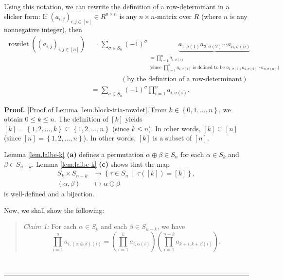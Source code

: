 \documentclass[numbers=enddot,12pt,final,onecolumn,notitlepage,english]{scrartcl}%
\theoremstyle{definition}
\newenvironment{statement}{\begin{quote}}{\end{quote}}
\newenvironment{proof}[1][Proof]{\noindent\textbf{#1.} }{\ \rule{0.5em}{0.5em}}
\let\sumnonlimits\sum
\let\prodnonlimits\prod
\renewcommand{\sum}{\sumnonlimits\limits}
\renewcommand{\prod}{\prodnonlimits\limits}
\newenvironment{verlong}{}{}
\begin{document}
\begin{verlong}
Using this notation, we can rewrite the definition of a row-determinant in a
slicker form: If $\left(  a_{i,j}\right)  _{i,j\in\left[  n\right]  }\in
R^{n\times n}$ is any $n\times n$-matrix over $R$ (where $n$ is any
nonnegative integer), then%
\begin{align}
\operatorname*{rowdet}\left(  \left(  a_{i,j}\right)  _{i,j\in\left[
n\right]  }\right)   &  =\sum_{\sigma\in S_{n}}\left(  -1\right)  ^{\sigma
}\underbrace{a_{1,\sigma\left(  1\right)  }a_{2,\sigma\left(  2\right)
}\cdots a_{n,\sigma\left(  n\right)  }}_{\substack{=\prod_{i=1}^{n}%
a_{i,\sigma\left(  i\right)  }\\\text{(since }\prod_{i=1}^{n}a_{i,\sigma
\left(  i\right)  }\text{ is defined to be }a_{1,\sigma\left(  1\right)
}a_{2,\sigma\left(  2\right)  }\cdots a_{n,\sigma\left(  n\right)  }\text{)}%
}}\nonumber\\
&  \ \ \ \ \ \ \ \ \ \ \ \ \ \ \ \ \ \ \ \ \left(  \text{by the definition of
a row-determinant}\right) \nonumber\\
&  =\sum_{\sigma\in S_{n}}\left(  -1\right)  ^{\sigma}\prod_{i=1}%
^{n}a_{i,\sigma\left(  i\right)  }. \label{pf.lem.block-tria-rowdet.rowdet=}%
\end{align}


\begin{proof}
[Proof of Lemma \ref{lem.block-tria-rowdet}.]From $k\in\left\{  0,1,\ldots
,n\right\}  $, we obtain $0\leq k\leq n$. The definition of $\left[  k\right]
$ yields $\left[  k\right]  =\left\{  1,2,\ldots,k\right\}  \subseteq\left\{
1,2,\ldots,n\right\}  $ (since $k\leq n$). In other words, $\left[  k\right]
\subseteq\left[  n\right]  $ (since $\left[  n\right]  =\left\{
1,2,\ldots,n\right\}  $). In other words, $\left[  k\right]  $ is a subset of
$\left[  n\right]  $.

Lemma \ref{lem.lalbe-k} \textbf{(a)} defines a permutation $\alpha\oplus
\beta\in S_{n}$ for each $\alpha\in S_{k}$ and $\beta\in S_{n-k}$. Lemma
\ref{lem.lalbe-k} \textbf{(c)} shows that the map
\begin{align*}
S_{k}\times S_{n-k}  &  \rightarrow\left\{  \tau\in S_{n}\ \mid\ \tau\left(
\left[  k\right]  \right)  =\left[  k\right]  \right\}  ,\\
\left(  \alpha,\beta\right)   &  \mapsto\alpha\oplus\beta
\end{align*}
is well-defined and a bijection.

Now, we shall show the following:

\begin{statement}
\textit{Claim 1:} For each $\alpha\in S_{k}$ and each $\beta\in S_{n-k}$, we
have%
\begin{equation}
\prod_{i=1}^{n}a_{i,\left(  \alpha\oplus\beta\right)  \left(  i\right)
}=\left(  \prod_{i=1}^{k}a_{i,\alpha\left(  i\right)  }\right)  \left(
\prod_{i=1}^{n-k}a_{k+i,k+\beta\left(  i\right)  }\right)  .
\label{pf.lem.block-tria-rowdet.prod=prodprod}%
\end{equation}


\end{statement}
\end{proof}
\end{verlong}
\end{document}
